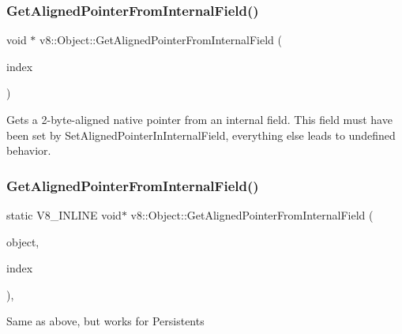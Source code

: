 \subsubsection{\texorpdfstring{Get\+Aligned\+Pointer\+From\+Internal\+Field()}{GetAlignedPointerFromInternalField()}\hspace{0.1cm}{\footnotesize\ttfamily [1/2]}}
{\footnotesize\ttfamily void $\ast$ v8\+::\+Object\+::\+Get\+Aligned\+Pointer\+From\+Internal\+Field (\begin{DoxyParamCaption}\item[{int}]{index }\end{DoxyParamCaption})}

Gets a 2-\/byte-\/aligned native pointer from an internal field. This field must have been set by Set\+Aligned\+Pointer\+In\+Internal\+Field, everything else leads to undefined behavior. \mbox{\label{classv8_1_1Object_a65b5a3dc93c0774594f8b0f2ab5481c8}} 
\subsubsection{\texorpdfstring{Get\+Aligned\+Pointer\+From\+Internal\+Field()}{GetAlignedPointerFromInternalField()}\hspace{0.1cm}{\footnotesize\ttfamily [2/2]}}
{\footnotesize\ttfamily static V8\+\_\+\+I\+N\+L\+I\+NE void$\ast$ v8\+::\+Object\+::\+Get\+Aligned\+Pointer\+From\+Internal\+Field (\begin{DoxyParamCaption}\item[{const \mbox{\hyperlink{classv8_1_1PersistentBase}{Persistent\+Base}}$<$ \mbox{\hyperlink{classv8_1_1Object}{Object}} $>$ \&}]{object,  }\item[{int}]{index }\end{DoxyParamCaption})\hspace{0.3cm}{\ttfamily [inline]}, {\ttfamily [static]}}

Same as above, but works for Persistents \mbox{\label{classv8_1_1Object_a7bbe987794658f20a3ec1b68326305e6}} 
